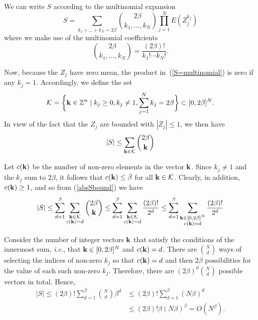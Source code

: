 \documentclass[journal]{IEEEtran}
\begin{document}
\begin{IEEEproof}
We can write $S$ according to the multinomial expansion
\begin{equation}
  S = \sum_{k_1 + \dots + k_N = 2 \beta} {2 \beta \choose k_1, \dots, k_N} \prod_{j=1}^N E(Z_j^{k_j})
  	\label{S=multinomial}
\end{equation}
where we make use of the multinomial coefficients
\begin{equation*}
  {2 \beta \choose k_1, \dots, k_N} = \frac{(2\beta)!}{k_1! \cdots k_N!}.
\end{equation*}

Now, because the $Z_j$ have zero mean, the product in~(\ref{S=multinomial}) is
zero if any $k_j = 1$.  Accordingly,  we define the set
\begin{equation*}
  \mathcal{K} = \bigg\{\mathbf{k} \in {\mathbb Z}^n \mid k_j \geq 0, k_j \neq 1, \sum_{j=1}^N k_j = 2 \beta\bigg\}
  \subset [0, 2 \beta]^N.
\end{equation*}
In view of the fact that the $Z_j$ are bounded with $|Z_j| \leq 1$, we then
have
\begin{equation}
  |S| \leq \sum_{\kbf \in \mathcal{K}} {2 \beta \choose \kbf}  \label{absSbound}
\end{equation}

Let $c(\mathbf{k})$ be the number of non-zero elements in the vector $\mathbf{k}$.  Since
$k_j \neq 1$ and the $k_j$ sum to $2 \beta$, it follows that $c(\mathbf{k}) \leq
\beta$ for all $\mathbf{k} \in \mathcal{K}$.  Clearly, in addition, $c(\mathbf{k}) \geq 1$,
and so from (\ref{absSbound}) we have
\begin{equation*}
  |S| \leq \sum_{d=1}^{\beta} \sum_{\substack{\mathbf{k} \in \mathcal{K} \\ c(\mathbf{k}) = d}} {2 \beta \choose \mathbf{k}}
	\leq \sum_{d=1}^{\beta} \sum_{\substack{\mathbf{k} \in \mathcal{K} \\ c(\mathbf{k}) = d}} \frac{(2 \beta)!}{2^d}
	\leq \sum_{d=1}^{\beta} \sum_{\substack{\mathbf{k} \in [0, 2 \beta]^N \\ c(\mathbf{k}) = d}} \frac{(2 \beta)!}{2^d}
\end{equation*}

Consider the number of integer vectors $\mathbf{k}$ that satisfy the conditions of
the innermost sum, \emph{i.e.}, that $\mathbf{k} \in [0, 2\beta]^N$ and $c(\mathbf{k}) =
d$.  There are ${N \choose d}$ ways of selecting the indices of non-zero $k_j$
so that $c(\mathbf{k}) = d$ and then $2 \beta$ possibilities for the value of each
such non-zero $k_j$.  Therefore, there are $(2 \beta)^d {N \choose d}$
possible vectors in total.  Hence,
\begin{align*}
  |S| \leq (2 \beta)! \sum_{d=1}^{\beta} {N \choose d} \beta^d &\leq (2 \beta)! \sum_{d=1}^{\beta} (N \beta)^d \\ &\leq (2 \beta)! \beta (N \beta)^{\beta} = O(N^\beta).
\end{align*}
\end{IEEEproof}
\end{document}
